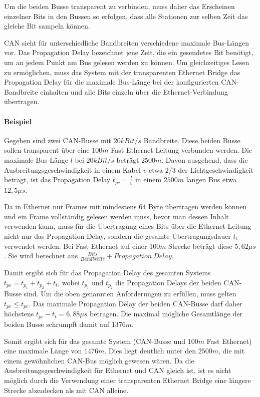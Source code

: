 Um die beiden Busse transparent zu verbinden, muss daher das Erscheinen einzelner
Bits in den Bussen so erfolgen, dass alle Stationen zur selben Zeit das gleiche Bit
sampeln können.

CAN sieht für unterschiedliche Bandbreiten verschiedene maximale Bus-Längen vor. Das
Propagation Delay bezeichnet jene Zeit, die ein gesendetes Bit benötigt, um an jedem
Punkt am Bus gelesen werden zu können. Um gleichzeitiges Lesen zu ermöglichen, muss
das System mit der transparenten Ethernet Bridge das Propagation Delay für die
maximale Bus-Länge bei der konfigurierten CAN-Bandbreite einhalten und alle Bits
einzeln über die Ethernet-Verbindung übertragen.

\paragraph{Beispiel}
Gegeben sind zwei CAN-Busse mit $20 kBit/s$ Bandbreite. Diese beiden Busse sollen
transparent über eine $100 m$ Fast Ethernet Leitung verbunden werden. Die maximale
Bus-Länge $l$ bei $20 kBit/s$ beträgt $2500 m$. Davon ausgehend, dass die
Ausbreitungsgeschwindigkeit in einem Kabel $v$ etwa $2/3$ der Lichtgeschwindigkeit beträgt,
ist das Propagation Delay $t_{pc} = \frac{l}{v}$ in einem $2500 m$ langen Bus etwa
$12,5 \mu s$.

Da in Ethernet nur Frames mit mindestens $64$ Byte übertragen werden können und ein
Frame vollständig gelesen werden muss, bevor man dessen Inhalt verwenden kann, muss
für die Übertragung eines Bits über die Ethernet-Leitung nicht nur das Propagation
Delay, sondern die gesamte Übertragungsdauer $t_t$ verwendet werden. Bei Fast
Ethernet auf einer $100 m$ Strecke beträgt diese $5,62 \mu s$. Sie wird berechnet aus
$\frac{Bits}{Bandbreite} + Propagation\: Delay$.

Damit ergibt sich für das Propagation Delay des gesamten Systems $t_{pe} = t_{p_1} +
t_{p_2} + t_t$, wobei $t_{p_1}$ und $t_{p_2}$ die Propagation Delays der beiden
CAN-Busse sind. Um die oben genannten Anforderungen zu erfüllen, muss gelten $t_{pe}
\leq t_{pc}$. Das maximale Propagation Delay der beiden CAN-Busse darf daher
höchstens $t_{pc} - t_t = 6,88 \mu s$ betragen. Die maximal mögliche Gesamtlänge der
beiden Busse schrumpft damit auf $1376 m$.

Somit ergibt sich für das gesamte System (CAN-Busse und $100 m$ Fast Ethernet) eine
maximale Länge von $1476 m$. Dies liegt deutlich unter den $2500 m$, die mit einem
gewöhnlichen CAN-Bus möglich gewesen wären. Da die Ausbreitungsgeschwindigkeit für
Ethernet und CAN gleich ist, ist es nicht möglich durch die Verwendung einer
transparenten Ethernet Bridge eine längere Strecke abzudecken als mit CAN alleine.

